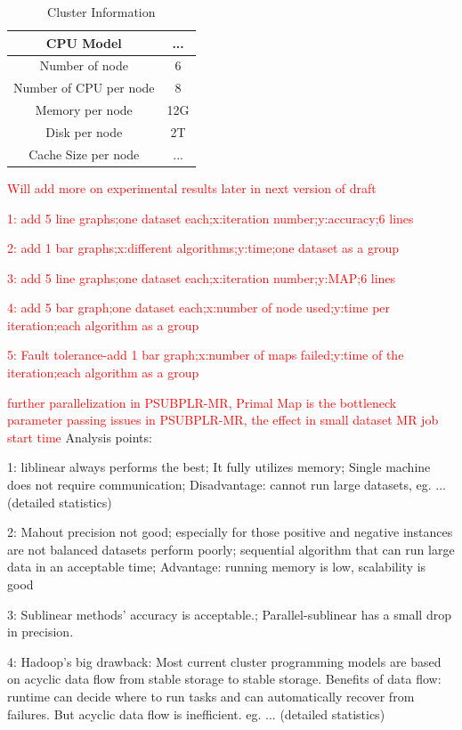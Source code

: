 \documentclass{llncs}
\newcommand{\comment}{\textcolor{red}}
\begin{document}
\begin{table}[h]
\centering
\caption{Cluster Information}\label{tab:table2}
\begin{tabular}{|c|c|}
\hline
    CPU Model & ... \\
\hline
    Number of node & 6 \\
\hline
    Number of CPU per node & 8\\
\hline
    Memory per node & 12G \\
\hline
    Disk per node & 2T \\
\hline
    Cache Size per node & ... \\
\hline
\end{tabular}
\end{table}

\comment{Will add more on experimental results later in next version of draft}

\comment{1: add 5 line graphs;one dataset each;x:iteration number;y:accuracy;6 lines}

\comment{2: add 1 bar graphs;x:different algorithms;y:time;one dataset as a group}

\comment{3: add 5 line graphs;one dataset each;x:iteration number;y:MAP;6 lines}

\comment{4: add 5 bar graph;one dataset each;x:number of node used;y:time per iteration;each algorithm as a group}

\comment{5: Fault tolerance-add 1 bar graph;x:number of maps failed;y:time of the iteration;each algorithm as a group}


\comment{further parallelization in PSUBPLR-MR, Primal Map is the bottleneck}
\comment{parameter passing issues in PSUBPLR-MR, the effect in small dataset}
\comment{MR job start time}
Analysis points:

1: liblinear always performs the best; It fully utilizes memory; Single machine does not require communication; Disadvantage: cannot run large datasets, eg. ...(detailed statistics)

2: Mahout precision not good; especially for those positive and negative instances are not balanced datasets perform poorly; sequential algorithm that can run large data in an acceptable time; Advantage: running memory is low, scalability is good

3: Sublinear methods' accuracy is acceptable.; Parallel-sublinear has a small drop in precision.

4: Hadoop's big drawback: Most current cluster programming models are based on acyclic data flow from stable storage to stable storage. Benefits of data flow: runtime can decide where to run tasks and can automatically recover from failures. But acyclic data flow is inefficient. eg. ... (detailed statistics)
\end{document}
